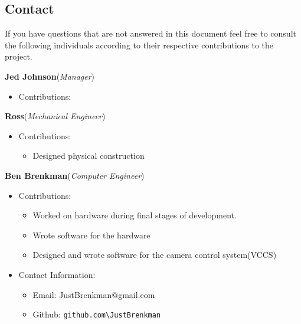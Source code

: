 \subsection*{Contact}
If you have questions that are not answered in this document feel free to consult the following individuals according to their respective contributions to the project.
\par \textbf{Jed Johnson}(\emph{Manager})
\begin{itemize}
    \item[] Contributions:
\end{itemize}
\par \textbf{Ross}(\emph{Mechanical Engineer})
\begin{itemize}
    \item[] Contributions:
    \begin{itemize}
        \item Designed physical construction
    \end{itemize} 
\end{itemize}
\par \textbf{Ben Brenkman}(\emph{Computer Engineer})
\begin{itemize}
    \item[] Contributions:
    \begin{itemize}
        \item Worked on hardware during final stages of development. 
        \item Wrote software for the hardware
        \item Designed and wrote software for the camera control system(VCCS)
    \end{itemize} 
    \item[] Contact Information:
    \begin{itemize}
        \item[] Email: JustBrenkman@gmail.com
        \item[] Github: \verb|github.com\JustBrenkman|
    \end{itemize} 
\end{itemize}